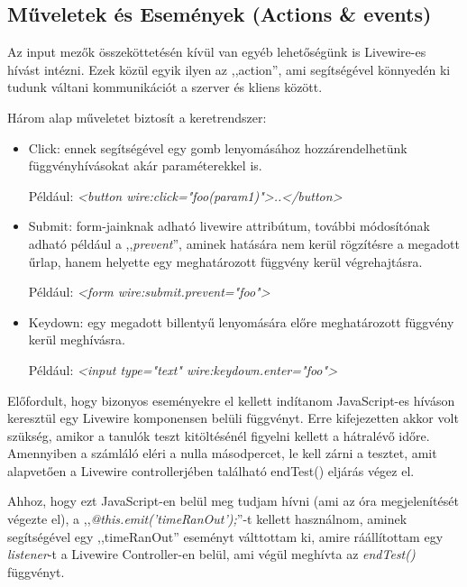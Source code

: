 \documentclass[
]{thesis-ekf}
\theoremstyle{definition}
\theoremstyle{remark}
\begin{document}
                
                \subsection{Műveletek és Események (Actions \& events)}\cite{Livewire-Actions, Livewire-Events}
                Az input mezők összeköttetésén kívül van egyéb lehetőségünk is Livewire-es hívást intézni. Ezek közül egyik ilyen az ,,action'', ami segítségével könnyedén ki tudunk váltani kommunikációt a szerver és kliens között.

                Három alap műveletet biztosít a keretrendszer:
                \begin{itemize}
                    \item Click: ennek segítségével egy gomb lenyomásához hozzárendelhetünk függvényhívásokat akár paraméterekkel is. 
                    
                    Például: \emph{<button wire:click="foo(param1)">..</button>}
                    \item Submit: form-jainknak adható livewire attribútum, további módosítónak adható például a ,,\emph{prevent}'', aminek hatására nem kerül rögzítésre a megadott űrlap, hanem helyette egy meghatározott függvény kerül végrehajtásra. 
                    
                    Például: \emph{<form wire:submit.prevent="foo">}
                    \item Keydown: egy megadott billentyű lenyomására előre meghatározott függvény kerül meghívásra. 
                    
                    Például: \emph{<input type="text" wire:keydown.enter="foo">}
                \end{itemize}

                Előfordult, hogy bizonyos eseményekre el kellett indítanom JavaScript-es híváson keresztül egy Livewire komponensen belüli függvényt. Erre kifejezetten akkor volt szükség, amikor a tanulók teszt kitöltésénél figyelni kellett a hátralévő időre. Amennyiben a számláló eléri a nulla másodpercet, le kell zárni a tesztet, amit alapvetően a Livewire controllerjében található endTest() eljárás végez el. 
                
                Ahhoz, hogy ezt JavaScript-en belül meg tudjam hívni (ami az óra megjelenítését végezte el), a ,,\emph{@this.emit('timeRanOut');}''-t kellett használnom, aminek segítségével egy ,,timeRanOut'' eseményt válttottam ki, amire ráállítottam egy \emph{listener}-t a Livewire Controller-en belül, ami végül meghívta az \emph{endTest()} függvényt.
                
\end{document}
